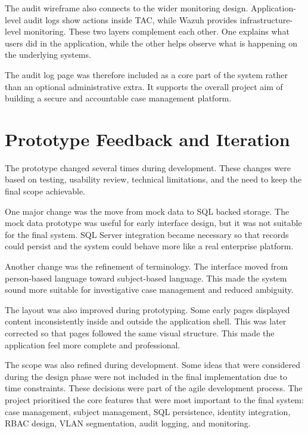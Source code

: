 The audit wireframe also connects to the wider monitoring design. Application-level audit logs show actions inside TAC, while Wazuh provides infrastructure-level monitoring. These two layers complement each other. One explains what users did in the application, while the other helps observe what is happening on the underlying systems.

The audit log page was therefore included as a core part of the system rather than an optional administrative extra. It supports the overall project aim of building a secure and accountable case management platform.


\section{Prototype Feedback and Iteration}

The prototype changed several times during development. These changes were based on testing, usability review, technical limitations, and the need to keep the final scope achievable.

One major change was the move from mock data to SQL backed storage. The mock data prototype was useful for early interface design, but it was not suitable for the final system. SQL Server integration became necessary so that records could persist and the system could behave more like a real enterprise platform.

Another change was the refinement of terminology. The interface moved from person-based language toward subject-based language. This made the system sound more suitable for investigative case management and reduced ambiguity.

The layout was also improved during prototyping. Some early pages displayed content inconsistently inside and outside the application shell. This was later corrected so that pages followed the same visual structure. This made the application feel more complete and professional.

The scope was also refined during development. Some ideas that were considered during the design phase were not included in the final implementation due to time constraints. These decisions were part of the agile development process. The project prioritised the core features that were most important to the final system: case management, subject management, SQL persistence, identity integration, RBAC design, VLAN segmentation, audit logging, and monitoring.

